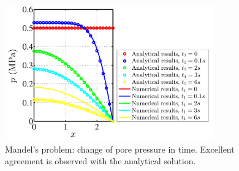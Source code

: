 \documentclass{elsarticle}
\begin{document}
	
	\begin{figure}[htbp]
		\centering
		\includegraphics[width=0.8\textwidth]{mandel_pressure}
		\caption{Mandel's problem: change of pore pressure in time. Excellent agreement is observed with the analytical solution.}
		\label{Fig:mandel_pressure}
	\end{figure}
	
\end{document}
